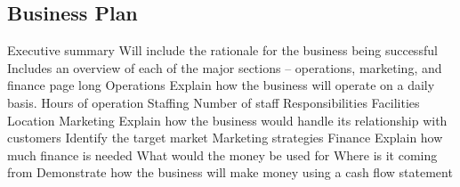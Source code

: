 \subsection{Business Plan}
\begin{outline}
\1 Executive summary
\2 Will include the rationale for the business being successful
\2 Includes an overview of each of the major sections -- operations, marketing, and finance
 page long
\1 Operations
\2 Explain how the business will operate on a daily basis.
\3 Hours of operation
\3 Staffing
\4 Number of staff
\4 Responsibilities
\3 Facilities
\3 Location
\1 Marketing
\2 Explain how the business would handle its relationship with customers
\3 Identify the target market
\3 Marketing strategies
\1 Finance
\2 Explain how much finance is needed
\3 What would the money be used for
\3 Where is it coming from
\3 Demonstrate how the business will make money using a cash flow statement
\end{outline}
